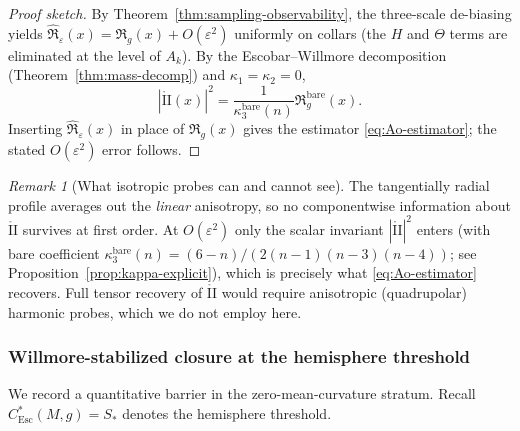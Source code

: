 \documentclass[11pt,reqno,a4paper]{amsart}
\numberwithin{equation}{section}
\theoremstyle{plain}
\theoremstyle{remark}
\newtheorem{remark}[theorem]{Remark}
\theoremstyle{plain}
\begin{document}
\begin{proof}[Proof sketch]
By Theorem~\ref{thm:sampling-observability}, the three-scale de-biasing yields
$
\widehat{\mathfrak R}_\varepsilon(x)=\mathfrak R_g(x)+O(\varepsilon^2)
$
uniformly on collars (the $H$ and $\Theta$ terms are eliminated at the level of $A_k$).
By the Escobar--Willmore decomposition (Theorem~\ref{thm:mass-decomp}) and $\kappa_1=\kappa_2=0$,
\[
|\mathring{\mathrm{II}}(x)|^2
= \frac{1}{\kappa_3^{\mathrm{bare}}(n)}\mathfrak R_g^{\mathrm{bare}}(x).
\]
Inserting $\widehat{\mathfrak R}_\varepsilon(x)$ in place of $\mathfrak R_g(x)$ gives the estimator
\eqref{eq:Ao-estimator}; the stated $O(\varepsilon^2)$ error follows.
\end{proof}

\begin{remark}[What isotropic probes can and cannot see]
The tangentially radial profile averages out the \emph{linear} anisotropy, so no componentwise information about $\mathring{\mathrm{II}}$ survives at first order.
At $O(\varepsilon^2)$ only the scalar invariant $|\mathring{\mathrm{II}}|^2$ enters (with bare coefficient $\kappa_3^{\mathrm{bare}}(n)=(6-n)/(2(n-1)(n-3)(n-4))$; see Proposition~\ref{prop:kappa-explicit}), which is precisely what \eqref{eq:Ao-estimator} recovers.
Full tensor recovery of $\mathring{\mathrm{II}}$ would require anisotropic (quadrupolar) harmonic probes, which we do not employ here.
\end{remark}


\subsubsection{Willmore-stabilized closure at the hemisphere threshold}

We record a quantitative barrier in the zero-mean-curvature stratum.
Recall $C^\ast_{\mathrm{Esc}}(M,g)=S_\ast$ denotes the hemisphere threshold.
\end{document}
